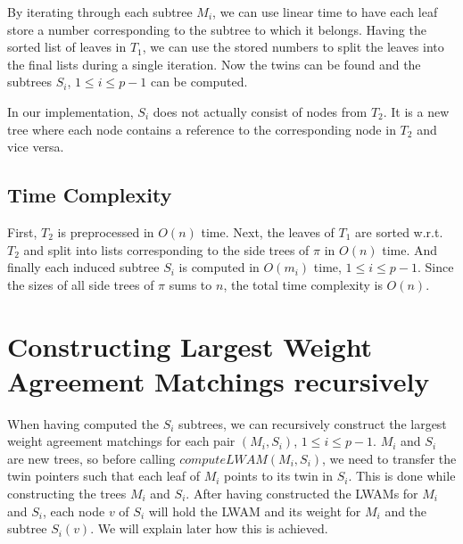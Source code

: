 
By iterating through each subtree $M_i$, we can use linear time to have each leaf store a number corresponding to the subtree to which it belongs. Having the sorted list of leaves in $T_1$, we can use the stored numbers to split the leaves into the final lists during a single iteration. Now the twins can be found and the subtrees $S_i$, $1 \le i \le p-1$ can be computed.

In our implementation, $S_i$ does not actually consist of nodes from $T_2$. It is a new tree where each node contains a reference to the corresponding node in $T_2$ and vice versa.

\subsection{Time Complexity}
First, $T_2$ is preprocessed in $O(n)$ time. Next, the leaves of $T_1$ are sorted w.r.t. $T_2$ and split into lists corresponding to the side trees of $\pi$ in $O(n)$ time. And finally each induced subtree $S_i$ is computed in $O(m_i)$ time, $1 \le i \le p-1$. Since the sizes of all side trees of $\pi$ sums to $n$, the total time complexity is $O(n)$.

\section{Constructing Largest Weight Agreement Matchings recursively}
When having computed the $S_i$ subtrees, we can recursively construct the largest weight agreement matchings for each pair $(M_i, S_i)$, $1 \le i \le p-1$. $M_i$ and $S_i$ are new trees, so before calling $computeLWAM(M_i, S_i)$, we need to transfer the twin pointers such that each leaf of $M_i$ points to its twin in $S_i$. This is done while constructing the trees $M_i$ and $S_i$.
After having constructed the LWAMs for $M_i$ and $S_i$, each node $v$ of $S_i$ will hold the LWAM and its weight for $M_i$ and the subtree $S_i(v)$. We will explain later how this is achieved.

